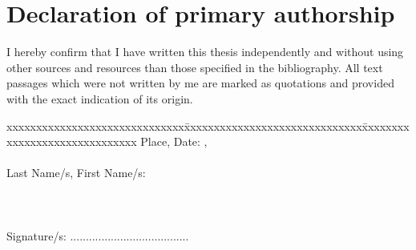 \chapter*{Declaration of primary authorship}
\label{chap:declaration_authorship}

\vspace*{10mm} 

I hereby confirm that I  have written this thesis independently and without using other sources and resources than those specified in the bibliography. All text passages which were not written by me are marked as quotations and provided with the exact indication of its origin. 

\vspace{15mm}

\begin{tabbing}
xxxxxxxxxxxxxxxxxxxxxxxxxxxxxx\=xxxxxxxxxxxxxxxxxxxxxxxxxxxxxx\=xxxxxxxxxxxxxxxxxxxxxxxxxxxxxx\kill
Place, Date:		\> [Biel], \versiondate \\ \\ 
Last Name/s, First Name/s:	 	 \\ \\ \\ \\ 
Signature/s:	\> ......................................\> \\
\end{tabbing}
